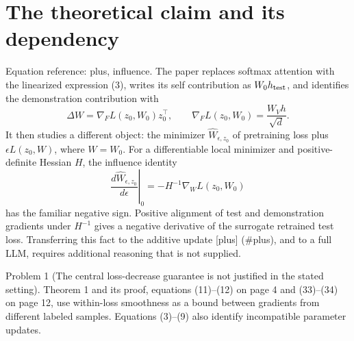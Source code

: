 \documentclass[10pt]{article}
\begin{document}
\section*{The theoretical claim and its dependency}
Equation reference: plus, influence. The paper replaces softmax attention with the linearized expression (3), writes its self contribution as \(W_0h_{\rm test}\), and identifies the demonstration contribution with \[
 \Delta W=\nabla_F L(z_0,W_0)z_0^\top,
 \qquad \nabla_F L(z_0,W_0)=\frac{W_Vh}{\sqrt d}.\] It then studies a different object: the minimizer \(\widehat W_{\epsilon,z_0}\) of pretraining loss plus \(\epsilon L(z_0,W)\), where \(\widehat W=W_0\). For a differentiable local minimizer and positive-definite Hessian \(H\), the influence identity \[
 \left.\frac{d\widehat W_{\epsilon,z_0}}{d\epsilon}\right|_0
 =-H^{-1}\nabla_W L(z_0,W_0)\] has the familiar negative sign. Positive alignment of test and demonstration gradients under \(H^{-1}\) gives a negative derivative of the surrogate retrained test loss. Transferring this fact to the additive update [plus] (\#plus), and to a full LLM, requires additional reasoning that is not supplied.\par
Problem 1 (The central loss-decrease guarantee is not justified in the stated setting).  Theorem 1 and its proof, equations (11)–(12) on page 4 and (33)–(34) on page 12, use within-loss smoothness as a bound between gradients from different labeled samples. Equations (3)–(9) also identify incompatible parameter updates.\par
\end{document}
